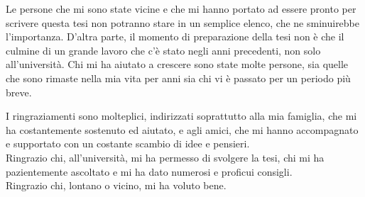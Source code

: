 Le persone che mi sono state vicine e che mi hanno portato ad essere pronto per scrivere questa tesi non potranno stare in un semplice elenco, che ne sminuirebbe l'importanza.
D'altra parte, il momento di preparazione della tesi non è che il culmine di un grande lavoro che c'è stato negli anni precedenti, non solo all'università.
Chi mi ha aiutato a crescere sono state molte persone, sia quelle che sono rimaste nella mia vita per anni sia chi vi è passato per un periodo più breve.

I ringraziamenti sono molteplici, indirizzati soprattutto alla mia famiglia, che mi ha costantemente sostenuto ed aiutato, e agli amici, che mi hanno accompagnato e supportato con un costante scambio di idee e pensieri.
\\
Ringrazio chi, all'università, mi ha permesso di svolgere la tesi, chi mi ha pazientemente ascoltato e mi ha dato numerosi e proficui consigli.
\\
Ringrazio chi, lontano o vicino, mi ha voluto bene.
